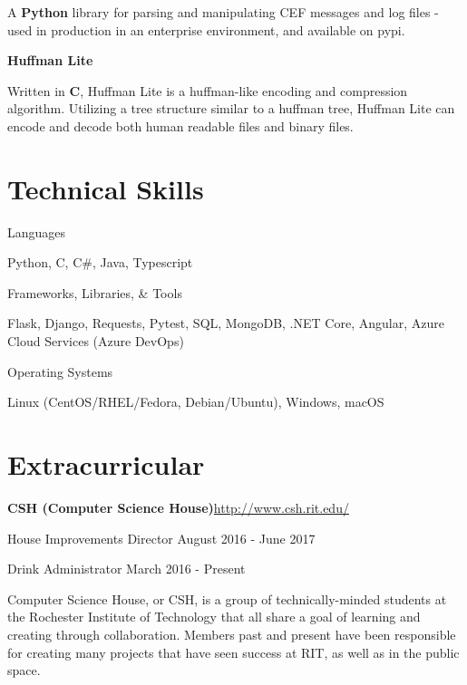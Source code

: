 \documentclass[margin,line]{resume}
\newcommand{\rurl}[1]{\hfill {\footnotesize \url{#1}}}
\begin{document}
\begin{resume}
\begin{asparablank}
		\small A \textbf{Python} library for parsing and manipulating CEF messages and log files - used in production in 
        an enterprise environment, and available on pypi.
		\normalsize
		\\
		\item {\bf Huffman Lite}

		\small Written in \textbf{C}, Huffman Lite is a huffman-like encoding and compression algorithm. Utilizing a 
        tree structure similar to a huffman tree, Huffman Lite can encode and decode both human readable files and 
        binary files.
		\normalsize
	\end{asparablank}

\section{\mysidestyle Technical Skills}
	\begin{compactdesc}
		\item[Languages] \begin{inparaenum} { \small
			Python, C, C\#, Java, Typescript
		} \end{inparaenum}
        \item[Frameworks, Libraries, \& Tools] \begin{inparaenum} { \small
			Flask, Django, Requests, Pytest, SQL, MongoDB, .NET Core, Angular, Azure Cloud Services (Azure DevOps)
        } \end{inparaenum}
		\item[Operating Systems] \begin{inparaenum} { \small
			Linux (CentOS/RHEL/Fedora, Debian/Ubuntu), Windows, macOS
		} \end{inparaenum}
        \normalsize
	\end{compactdesc}

\section{\mysidestyle Extracurricular}
	\begin{asparablank}
		\item {\bf CSH ({\small Computer Science House})}\rurl{http://www.csh.rit.edu/}
		\small	\item House Improvements Director \hfill August 2016 - June 2017
        \small  \item Drink Administrator \hfill March 2016 - Present
        \linebreak

        \small Computer Science House, or CSH, is a group of technically-minded students at the Rochester Institute of Technology that all share a goal of learning and creating through collaboration. Members past and present have been responsible for creating many projects that have seen success at RIT, as well as in the public space.
	\end{asparablank}


\end{resume}
\end{document}
